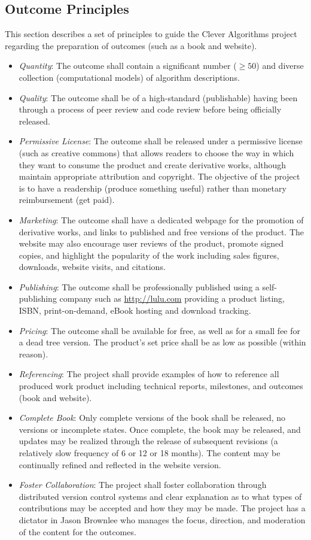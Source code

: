 \documentclass[a4paper, 11pt]{article}
\begin{document}
\subsection{Outcome Principles}
This section describes a set of principles to guide the Clever Algorithms project regarding the preparation of outcomes (such as a book and website).

\begin{itemize}
	\item \emph{Quantity}: The outcome shall contain a significant number ($\geq 50$) and diverse collection (computational models) of algorithm descriptions.
	\item \emph{Quality}: The outcome shall be of a high-standard (publishable) having been through a process of peer review and code review before being officially released. 
	\item \emph{Permissive License}: The outcome shall be released under a permissive license (such as creative commons) that allows readers to choose the way in which they want to consume the product and create derivative works, although maintain appropriate attribution and copyright. The objective of the project is to have a readership (produce something useful) rather than monetary reimbursement (get paid). 
	\item \emph{Marketing}: The outcome shall have a dedicated webpage for the promotion of derivative works, and links to published and free versions of the product. The website may also encourage user reviews of the product, promote signed copies, and highlight the popularity of the work including sales figures, downloads, website visits, and citations.
	\item \emph{Publishing}: The outcome shall be professionally published using a self-publishing company such as \url{http://lulu.com} providing a product listing, ISBN, print-on-demand, eBook hosting and download tracking.
	\item \emph{Pricing}: The outcome shall be available for free, as well as for a small fee for a dead tree version. The product's set price shall be as low as possible (within reason).
	\item \emph{Referencing}: The project shall provide examples of how to reference all produced work product including technical reports, milestones, and outcomes (book and website).
	\item \emph{Complete Book}: Only complete versions of the book shall be released, no versions or incomplete states. Once complete, the book  may be released, and updates may be realized through the release of subsequent revisions (a relatively slow frequency of 6 or 12 or 18 months). The content may be continually refined and reflected in the website version.
	\item \emph{Foster Collaboration}: The project shall foster collaboration through distributed version control systems and clear explanation as to what types of contributions may be accepted and how they may be made. The project has a dictator in Jason Brownlee who manages the focus, direction, and moderation of the content for the outcomes.
\end{itemize}




\end{document}
